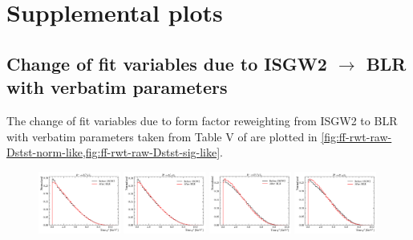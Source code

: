 \chapter{Supplemental plots}

\section{Change of fit variables due to ISGW2 $\rightarrow$ BLR with verbatim
parameters}

The change of fit variables due to form factor reweighting from ISGW2 to
BLR with verbatim parameters taken from Table V of \cite{Bernlochner_2018}
are plotted in
\cref{fig:ff-rwt-raw-Dstst-norm-like,fig:ff-rwt-raw-Dstst-sig-like}.


\begin{figure}[ht]
    \centering
    \includegraphics[width=0.24\textwidth]{
        ./figs-supplemental-plots/Dstst-form-factors/DststMu/D0stst0Mu.pdf
    }
    \includegraphics[width=0.24\textwidth]{
        ./figs-supplemental-plots/Dstst-form-factors/DststMu/D0ststMu.pdf
    }
    \includegraphics[width=0.24\textwidth]{
        ./figs-supplemental-plots/Dstst-form-factors/DststMu/D1pstst0Mu.pdf
    }
    \includegraphics[width=0.24\textwidth]{
        ./figs-supplemental-plots/Dstst-form-factors/DststMu/D1pststMu.pdf
    }


\end{figure}
